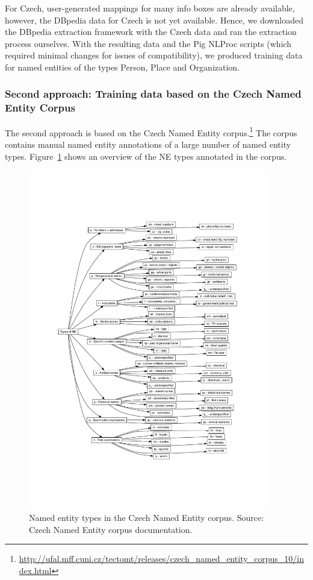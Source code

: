 For Czech, user-generated mappings for many info boxes are already available, however,
the DBpedia data for Czech is not yet available. Hence, we downloaded the DBpedia
extraction framework with the Czech data and ran the extraction process ourselves.
With the resulting data and the Pig NLProc scripts (which required minimal changes
for issues of compatibility), we produced training data for named entities of the types
Person, Place and Organization.



\subsubsection*{Second approach: Training data based on the Czech Named Entity Corpus}

The second approach is based on the Czech Named Entity corpus.\footnote{\url{http://ufal.mff.cuni.cz/tectomt/releases/czech_named_entity_corpus_10/index.html}}
The corpus contains manual named entity annotations of a large number of named entity types. Figure~\ref{fig:figures_core_CzechNECorpus}
shows an overview of the NE types annotated in the corpus.


\begin{figure}[h]
	\centering
		\includegraphics[width=10.5cm]{figures/core/CzechNECorpus.pdf}
	\caption{Named entity types in the Czech Named Entity corpus. Source: Czech Named Entity corpus documentation.}
	\label{fig:figures_core_CzechNECorpus}
\end{figure}


